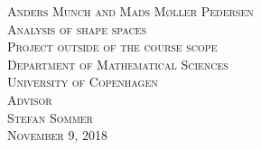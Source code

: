 \clearpage
\thispagestyle{empty}

\begin{titlingpage}
	\vspace*{5.5cm}
	\noindent
	{\large\textsc{Anders Munch and Mads Møller Pedersen}}\\[0.5cm]
	{\large\textsc{Analysis of shape spaces}}\\[0.1cm]
	\vfill\noindent
	{\large\textsc{Project outside of the course scope}}\\[0.2cm]
	\noindent
	{\large\textsc{Department of Mathematical Sciences}}\\[0.2cm]
	\noindent
	{\large\textsc{University of Copenhagen}}\\[1cm]
	{\large\textsc{Advisor \\[0.2cm] {\Large Stefan Sommer }}}\\[1cm]
	{\large\textsc{November 9, 2018}}
	\let\cleardoublepage\clearpage
\end{titlingpage}
\normalfont
\restoregeometry
\cleardoublepage